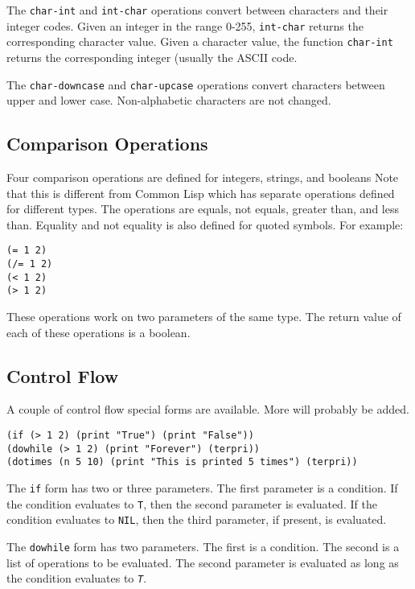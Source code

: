 \documentclass[10pt, openany]{book}
\newcommand{\function}[1]{\texttt{#1}}
\newcommand{\constant}[1]{\emph{\texttt{#1}}}
\newcommand{\cl}{Common Lisp}
\begin{document}
The \function{char-int} and \function{int-char} operations convert between characters and their integer codes.  Given an integer in the range 0-255, \function{int-char} returns the corresponding character value.  Given a character value, the function \function{char-int} returns the corresponding integer (usually the ASCII code.

The \function{char-downcase} and \function{char-upcase} operations convert characters between upper and lower case.  Non-alphabetic characters are not changed.

\subsection{Comparison Operations}
Four comparison operations are defined for integers, strings, and booleans  Note that this is different from \cl{} which has separate operations defined for different types.  The operations are equals, not equals, greater than, and less than.  Equality and not equality is also defined for quoted symbols.  For example:

\begin{lstlisting}
(= 1 2)
(/= 1 2)
(< 1 2)
(> 1 2)
\end{lstlisting}
These operations work on two parameters of the same type.  The return value of each of these operations is a boolean.

\subsection{Control Flow}
A couple of control flow special forms are available.  More will probably be added.

\begin{lstlisting}
(if (> 1 2) (print "True") (print "False"))
(dowhile (> 1 2) (print "Forever") (terpri))
(dotimes (n 5 10) (print "This is printed 5 times") (terpri))
\end{lstlisting}

The \function{if} form has two or three parameters.  The first parameter is a condition.  If the condition evaluates to \function{T}, then the second parameter is evaluated.  If the condition evaluates to \function{NIL}, then the third parameter, if present, is evaluated.

The \function{dowhile} form has two parameters.  The first is a condition.  The second is a list of operations to be evaluated.  The second parameter is evaluated as long as the condition evaluates to \constant{T}.
\end{document}
